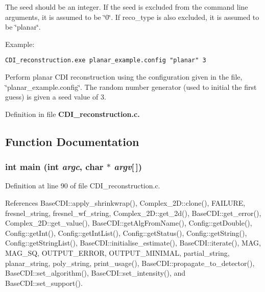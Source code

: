 The seed should be an integer. If the seed is excluded from the command line arguments, it is assumed to be \char`\"{}0\char`\"{}. If reco\_\-type is also excluded, it is assumed to be \char`\"{}planar\char`\"{}.

\begin{Desc}
\item[Example:]

\footnotesize\begin{verbatim}CDI_reconstruction.exe planar_example.config "planar" 3 \end{verbatim}
\normalsize
 Perform planar CDI reconstruction using the configuration given in the file, \char`\"{}planar\_\-example.config\char`\"{}. The random number generator (used to initial the first guess) is given a seed value of 3. \end{Desc}


Definition in file \bf{CDI\_\-reconstruction.c}.

\subsection{Function Documentation}
\subsubsection{\setlength{\rightskip}{0pt plus 5cm}int main (int {\em argc}, char $\ast$ {\em argv}[$\,$])}\label{CDI__reconstruction_8c_28052c36c3b61c6c0eaa18f5d226118f}




Definition at line 90 of file CDI\_\-reconstruction.c.

References Base\-CDI::apply\_\-shrinkwrap(), Complex\_\-2D::clone(), FAILURE, fresnel\_\-string, fresnel\_\-wf\_\-string, Complex\_\-2D::get\_\-2d(), Base\-CDI::get\_\-error(), Complex\_\-2D::get\_\-value(), Base\-CDI::get\-Alg\-From\-Name(), Config::get\-Double(), Config::get\-Int(), Config::get\-Int\-List(), Config::get\-Status(), Config::get\-String(), Config::get\-String\-List(), Base\-CDI::initialise\_\-estimate(), Base\-CDI::iterate(), MAG, MAG\_\-SQ, OUTPUT\_\-ERROR, OUTPUT\_\-MINIMAL, partial\_\-string, planar\_\-string, poly\_\-string, print\_\-usage(), Base\-CDI::propagate\_\-to\_\-detector(), Base\-CDI::set\_\-algorithm(), Base\-CDI::set\_\-intensity(), and Base\-CDI::set\_\-support().